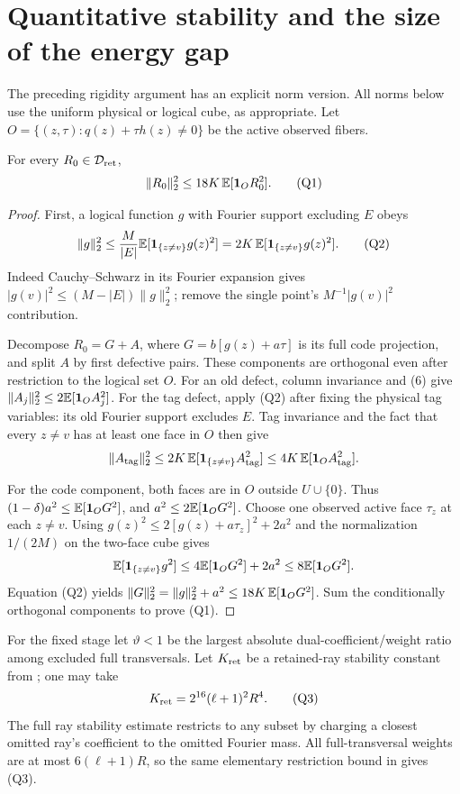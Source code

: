 \documentclass[11pt]{article}
\newcommand{\one}{\mathbf1}\newcommand{\relu}{\operatorname{ReLU}}
\begin{document}
\section{Quantitative stability and the size of the energy gap}
The preceding rigidity argument has an explicit norm version.
All norms below use the uniform physical or logical cube, as appropriate.
Let $O=\{(z,\tau):q(z)+\tau h(z)\ne0\}$ be the active observed fibers.

\begin{lemma}
For every $R_0\in\mathcal D_{\rm ret}$,
\[
                  \|R_0\|_2^2\le18K\,\E[\one_O R_0^2]. \tag{Q1}
\]
\end{lemma}
\begin{proof}
First, a logical function $g$ with Fourier support excluding $E$ obeys
\[
             \|g\|_2^2\le\frac M{|E|}
                              \E[\one_{\{z\ne v\}}g(z)^2]
                       =2K\,\E[\one_{\{z\ne v\}}g(z)^2]. \tag{Q2}
\]
Indeed Cauchy--Schwarz in its Fourier expansion gives
$|g(v)|^2\le(M-|E|)\|g\|_2^2$; remove the single point's
$M^{-1}|g(v)|^2$ contribution.

Decompose $R_0=G+A$, where $G=b[g(z)+a\tau]$ is its full code
projection, and split $A$ by first defective pairs. These components
are orthogonal even after restriction to the logical set $O$.
For an old defect, column invariance and (6) give
$\|A_j\|_2^2\le2\E[\one_O A_j^2]$.
For the tag defect, apply (Q2) after fixing the physical tag variables:
its old Fourier support excludes $E$. Tag invariance and the fact that
every $z\ne v$ has at least one face in $O$ then give
\[
 \|A_{\rm tag}\|_2^2
       \le2K\,\E[\one_{\{z\ne v\}}A_{\rm tag}^2]
       \le4K\,\E[\one_O A_{\rm tag}^2].
\]

For the code component, both faces are in $O$ outside $U\cup\{0\}$.
Thus $(1-\delta)a^2\le\E[\one_O G^2]$, and $a^2\le2\E[\one_O G^2]$.
Choose one observed active face $\tau_z$ at each $z\ne v$.
Using $g(z)^2\le2[g(z)+a\tau_z]^2+2a^2$ and the normalization
$1/(2M)$ on the two-face cube gives
\[
 \E[\one_{\{z\ne v\}}g^2]\le4\E[\one_O G^2]+2a^2
                                      \le8\E[\one_O G^2].
\]
Equation (Q2) yields
$\|G\|_2^2=\|g\|_2^2+a^2\le18K\,\E[\one_O G^2]$.
Sum the conditionally orthogonal components to prove (Q1).
\end{proof}

For the fixed stage let $\vartheta<1$ be the largest absolute
dual-coefficient/weight ratio among excluded full transversals.
Let $K_{\rm ret}$ be a retained-ray stability constant from
\cite{shared}; one may take
\[
                    K_{\rm ret}=2^{16}(\ell+1)^2R^4.    \tag{Q3}
\]
The full ray stability estimate restricts to any subset by charging
a closest omitted ray's coefficient to the omitted Fourier mass.
All full-transversal weights are at most $6(\ell+1)R$, so the same
elementary restriction bound in \cite{shared} gives (Q3).
\end{document}
